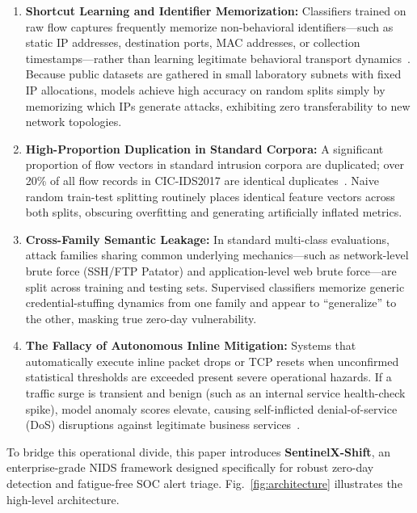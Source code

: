 \documentclass[conference,10pt,twocolumn]{IEEEtran}
\begin{document}
\begin{enumerate}
    \item \textbf{Shortcut Learning and Identifier Memorization:} Classifiers trained on raw flow captures frequently memorize non-behavioral identifiers---such as static IP addresses, destination ports, MAC addresses, or collection timestamps---rather than learning legitimate behavioral transport dynamics~\cite{arp2022dos,boutammok2024feature}. Because public datasets are gathered in small laboratory subnets with fixed IP allocations, models achieve high accuracy on random splits simply by memorizing which IPs generate attacks, exhibiting zero transferability to new network topologies.
    \item \textbf{High-Proportion Duplication in Standard Corpora:} A significant proportion of flow vectors in standard intrusion corpora are duplicated; over 20\% of all flow records in CIC-IDS2017 are identical duplicates~\cite{vanhoenshoven2025benchmarking}. Naive random train-test splitting routinely places identical feature vectors across both splits, obscuring overfitting and generating artificially inflated metrics.
    \item \textbf{Cross-Family Semantic Leakage:} In standard multi-class evaluations, attack families sharing common underlying mechanics---such as network-level brute force (SSH/FTP Patator) and application-level web brute force---are split across training and testing sets. Supervised classifiers memorize generic credential-stuffing dynamics from one family and appear to ``generalize'' to the other, masking true zero-day vulnerability.
    \item \textbf{The Fallacy of Autonomous Inline Mitigation:} Systems that automatically execute inline packet drops or TCP resets when unconfirmed statistical thresholds are exceeded present severe operational hazards. If a traffic surge is transient and benign (such as an internal service health-check spike), model anomaly scores elevate, causing self-inflicted denial-of-service (DoS) disruptions against legitimate business services~\cite{sommer2025fallacy}.
\end{enumerate}

To bridge this operational divide, this paper introduces \textbf{SentinelX-Shift}, an enterprise-grade NIDS framework designed specifically for robust zero-day detection and fatigue-free SOC alert triage. Fig.~\ref{fig:architecture} illustrates the high-level architecture.
\end{document}
